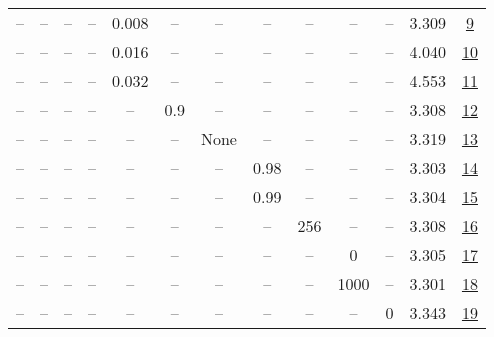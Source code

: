\begin{table}[H]
\begin{tabular}{ccccccccccccc}
-- & -- & -- & -- & 0.008 & -- & -- & -- & -- & -- & -- & 3.309 & \href{https://wandb.ai/stanford-mercury/optimizer-scaling/runs/sweep-130m-10B-mudamhbd426elr0.008-alr0.008-wd0.2-minlr0-warmup5-85334f}{9} \\
-- & -- & -- & -- & 0.016 & -- & -- & -- & -- & -- & -- & 4.040 & \href{https://wandb.ai/stanford-mercury/optimizer-scaling/runs/sweep-130m-10B-mudamhf92407lr0.016-alr0.008-wd0.2-minlr0-warmup5-68b6b0}{10} \\
-- & -- & -- & -- & 0.032 & -- & -- & -- & -- & -- & -- & 4.553 & \href{https://wandb.ai/stanford-mercury/optimizer-scaling/runs/sweep-130m-10B-mudamhfb7c63lr0.032-alr0.008-wd0.2-minlr0-warmup5-10e0e5}{11} \\
-- & -- & -- & -- & -- & 0.9 & -- & -- & -- & -- & -- & 3.308 & \href{https://wandb.ai/stanford-mercury/optimizer-scaling/runs/sweep-130m-10B-mudamh2a12ablr0.004-alr0.008-wd0.2-minlr0-warmup5-61c6ef}{12} \\
-- & -- & -- & -- & -- & -- & None & -- & -- & -- & -- & 3.319 & \href{https://wandb.ai/stanford-mercury/optimizer-scaling/runs/sweep-130m-10B-mudamh09df46lr0.004-alr0.008-wd0.2-minlr0-warmup5-64cea5}{13} \\
-- & -- & -- & -- & -- & -- & -- & 0.98 & -- & -- & -- & 3.303 & \href{https://wandb.ai/stanford-mercury/optimizer-scaling/runs/sweep-130m-10B-mudamh16212alr0.004-alr0.008-wd0.2-minlr0-warmup5-540efa}{14} \\
-- & -- & -- & -- & -- & -- & -- & 0.99 & -- & -- & -- & 3.304 & \href{https://wandb.ai/stanford-mercury/optimizer-scaling/runs/sweep-130m-10B-mudamh93dfb6lr0.004-alr0.008-wd0.2-minlr0-warmup5-782b20}{15} \\
-- & -- & -- & -- & -- & -- & -- & -- & 256 & -- & -- & 3.308 & \href{https://wandb.ai/stanford-mercury/optimizer-scaling/runs/sweep-130m-10B-mudamhcfaf6blr0.004-alr0.008-wd0.2-minlr0-warmup5-12e95e}{16} \\
-- & -- & -- & -- & -- & -- & -- & -- & -- & 0 & -- & 3.305 & \href{https://wandb.ai/stanford-mercury/optimizer-scaling/runs/sweep-130m-10B-mudamhaeb1a0lr0.004-alr0.008-wd0.2-minlr0-warmup0-197bd3}{17} \\
-- & -- & -- & -- & -- & -- & -- & -- & -- & 1000 & -- & 3.301 & \href{https://wandb.ai/stanford-mercury/optimizer-scaling/runs/sweep-130m-10B-mudamhfe560alr0.004-alr0.008-wd0.2-minlr0-warmup1-c685a8}{18} \\
-- & -- & -- & -- & -- & -- & -- & -- & -- & -- & 0 & 3.343 & \href{https://wandb.ai/stanford-mercury/optimizer-scaling/runs/sweep-130m-10B-mudamh8cc4falr0.004-alr0.008-wd0-minlr0-warmup500-044574}{19} \\

\end{tabular}
\end{table}

